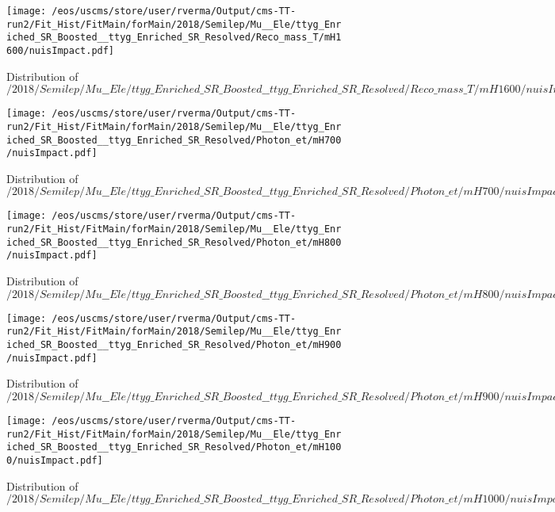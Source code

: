 \begin{figure}
\centering
\texttt{[image: /eos/uscms/store/user/rverma/Output/cms-TT-run2/Fit\_Hist/FitMain/forMain/2018/Semilep/Mu\_\_Ele/ttyg\_Enriched\_SR\_Boosted\_\_ttyg\_Enriched\_SR\_Resolved/Reco\_mass\_T/mH1600/nuisImpact.pdf]}
\caption{Distribution of $/2018/Semilep/Mu\_\_Ele/ttyg\_Enriched\_SR\_Boosted\_\_ttyg\_Enriched\_SR\_Resolved/Reco\_mass\_T/mH1600/nuisImpact.pdf$}
\end{figure}

\begin{figure}
\centering
\texttt{[image: /eos/uscms/store/user/rverma/Output/cms-TT-run2/Fit\_Hist/FitMain/forMain/2018/Semilep/Mu\_\_Ele/ttyg\_Enriched\_SR\_Boosted\_\_ttyg\_Enriched\_SR\_Resolved/Photon\_et/mH700/nuisImpact.pdf]}
\caption{Distribution of $/2018/Semilep/Mu\_\_Ele/ttyg\_Enriched\_SR\_Boosted\_\_ttyg\_Enriched\_SR\_Resolved/Photon\_et/mH700/nuisImpact.pdf$}
\end{figure}

\begin{figure}
\centering
\texttt{[image: /eos/uscms/store/user/rverma/Output/cms-TT-run2/Fit\_Hist/FitMain/forMain/2018/Semilep/Mu\_\_Ele/ttyg\_Enriched\_SR\_Boosted\_\_ttyg\_Enriched\_SR\_Resolved/Photon\_et/mH800/nuisImpact.pdf]}
\caption{Distribution of $/2018/Semilep/Mu\_\_Ele/ttyg\_Enriched\_SR\_Boosted\_\_ttyg\_Enriched\_SR\_Resolved/Photon\_et/mH800/nuisImpact.pdf$}
\end{figure}

\begin{figure}
\centering
\texttt{[image: /eos/uscms/store/user/rverma/Output/cms-TT-run2/Fit\_Hist/FitMain/forMain/2018/Semilep/Mu\_\_Ele/ttyg\_Enriched\_SR\_Boosted\_\_ttyg\_Enriched\_SR\_Resolved/Photon\_et/mH900/nuisImpact.pdf]}
\caption{Distribution of $/2018/Semilep/Mu\_\_Ele/ttyg\_Enriched\_SR\_Boosted\_\_ttyg\_Enriched\_SR\_Resolved/Photon\_et/mH900/nuisImpact.pdf$}
\end{figure}

\begin{figure}
\centering
\texttt{[image: /eos/uscms/store/user/rverma/Output/cms-TT-run2/Fit\_Hist/FitMain/forMain/2018/Semilep/Mu\_\_Ele/ttyg\_Enriched\_SR\_Boosted\_\_ttyg\_Enriched\_SR\_Resolved/Photon\_et/mH1000/nuisImpact.pdf]}
\caption{Distribution of $/2018/Semilep/Mu\_\_Ele/ttyg\_Enriched\_SR\_Boosted\_\_ttyg\_Enriched\_SR\_Resolved/Photon\_et/mH1000/nuisImpact.pdf$}
\end{figure}

